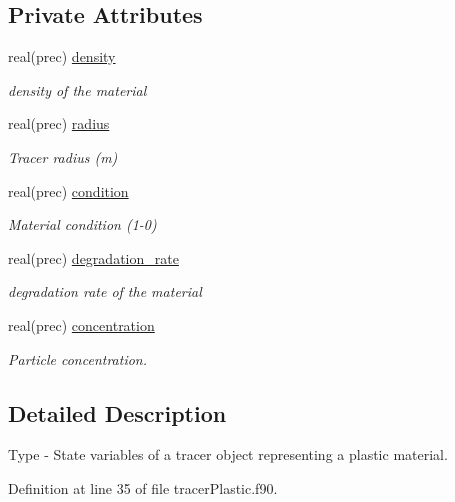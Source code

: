 \subsection*{Private Attributes}
\begin{DoxyCompactItemize}
\item 
real(prec) \mbox{\hyperlink{structtracerplastic__mod_1_1plastic__state__class_aa3cc141bbe8b1bf06f439e335c5477db}{density}}
\begin{DoxyCompactList}\small\item\em density of the material \end{DoxyCompactList}\item 
real(prec) \mbox{\hyperlink{structtracerplastic__mod_1_1plastic__state__class_adcabfc8dd732395f9721677448baf4c0}{radius}}
\begin{DoxyCompactList}\small\item\em Tracer radius (m) \end{DoxyCompactList}\item 
real(prec) \mbox{\hyperlink{structtracerplastic__mod_1_1plastic__state__class_ad97fc611c4c04bc78fa396b1bcc4c20a}{condition}}
\begin{DoxyCompactList}\small\item\em Material condition (1-\/0) \end{DoxyCompactList}\item 
real(prec) \mbox{\hyperlink{structtracerplastic__mod_1_1plastic__state__class_a2f155448ba50f5f28b289e690de2c8d1}{degradation\+\_\+rate}}
\begin{DoxyCompactList}\small\item\em degradation rate of the material \end{DoxyCompactList}\item 
real(prec) \mbox{\hyperlink{structtracerplastic__mod_1_1plastic__state__class_a90a24749c122f418f54c66f0b5d6a2e7}{concentration}}
\begin{DoxyCompactList}\small\item\em Particle concentration. \end{DoxyCompactList}\end{DoxyCompactItemize}


\subsection{Detailed Description}
Type -\/ State variables of a tracer object representing a plastic material. 

Definition at line 35 of file tracer\+Plastic.\+f90.



